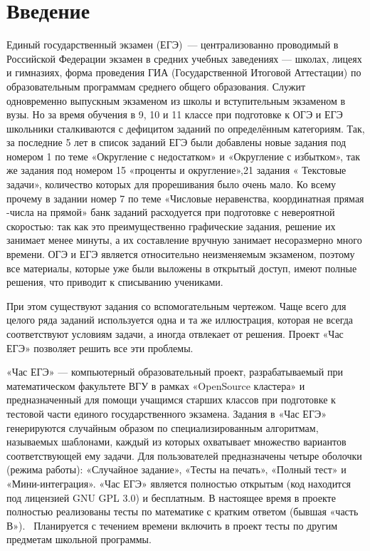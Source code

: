 
\section*{Введение}
Единый государственный экзамен (ЕГЭ)~— централизованно проводимый в Российской
Федерации экзамен в средних учебных заведениях — школах, лицеях и гимназиях,
форма проведения ГИА (Государственной Итоговой Аттестации) по образовательным программам среднего общего образования.
Служит одновременно выпускным экзаменом из школы и вступительным экзаменом в вузы.
Но за время обучения в 9, 10 и 11 классе при подготовке к ОГЭ и ЕГЭ школьники сталкиваются с дефицитом заданий по определённым категориям.
Так, за последние 5 лет в список заданий ЕГЭ были добавлены новые задания под номером 1 по теме «Округление с недостатком» и «Округление с избытком», так же задания под номером 15 «проценты и округление»,21 задания « Текстовые задачи», количество которых для прорешивания было очень мало. 
Ко всему прочему в задании номер 7 по теме «Числовые неравенства, координатная прямая -числа на прямой» банк заданий расходуется при подготовке с невероятной скоростью:
так как это преимущественно графические задания, решение их занимает менее минуты, а их составление вручную занимает несоразмерно много времени. ОГЭ и ЕГЭ является относительно неизменяемым экзаменом, поэтому все материалы, которые уже были выложены в открытый доступ, имеют полные решения, что приводит к списыванию учениками.

При этом существуют задания со вспомогательным чертежом. Чаще всего для целого ряда заданий используется одна и та же иллюстрация, которая не всегда соответствуют условиям задачи, а иногда отвлекает от решения.
Проект «Час ЕГЭ» позволяет решить все эти проблемы.

«Час ЕГЭ» — компьютерный образовательный проект, разрабатываемый при математическом
факультете ВГУ в рамках «OpenSource кластера» и предназначенный для помощи учащимся
старших классов при подготовке к тестовой части единого государственного экзамена.
Задания в «Час ЕГЭ» генерируются случайным образом по специализированным алгоритмам,
называемых шаблонами, каждый из которых
охватывает множество вариантов соответствующей ему задачи. Для
пользователей
предназначены четыре оболочки (режима работы): «Случайное задание», «Тесты на печать»,
«Полный тест» и «Мини-интеграция».
«Час ЕГЭ» является полностью открытым (код находится под лицензией GNU GPL 3.0)
и бесплатным.
В настоящее время в проекте полностью реализованы тесты по математике с кратким
ответом (бывшая «часть В»).~\cite{fipi}
Планируется с течением времени включить в проект тесты по другим предметам школьной
программы.

